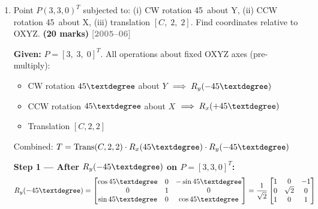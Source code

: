 \documentclass[12pt,a3paper]{article}
\newcommand{\yr}[1]{\hfill\textcolor{gray}{\small\textbf{[#1]}}}
\newcommand{\mk}[1]{\textcolor{orange!70!black}{\small\textbf{(#1 marks)}}}
\begin{document}
\begin{enumerate}
\begin{tcolorbox}[enhanced,breakable,ansbox,colback=cD!4,colframe=cD,
  boxrule=0.8pt,arc=5pt,
  title={\textbf{Answer}},fonttitle=\bfseries\color{white},colbacktitle=cD]
\[
  \boxed{T_{\text{new}} = \begin{bmatrix}0\\4\sqrt{3}\\-2\sqrt{3}\end{bmatrix}
  \approx \begin{bmatrix}0\\6.928\\-3.464\end{bmatrix}}
\]

\textit{Observation: The final position equals exactly the translation
vector from step (iii). This occurs because the frame's origin starts
at $[0,0,0]$, and the two rotations do not change the origin — only the
final translation moves it. The resulting orientation, however, has
changed significantly due to the two rotations.}

\end{tcolorbox}

\item \label{qlabel:C4-Q6}
Point $P(3,3,0)^T$ subjected to: (i) CW rotation 45\textdegree\ about
Y, (ii) CCW rotation 45\textdegree\ about X, (iii) translation
$[C,\;2,\;2]$. Find coordinates relative to OXYZ. \mk{20}
\yr{2005--06}

\begin{tcolorbox}[enhanced,breakable,ansbox,colback=cD!4,colframe=cD,
  boxrule=0.8pt,arc=5pt,
  title={\textbf{Answer}},fonttitle=\bfseries\color{white},colbacktitle=cD]

\textbf{Given:} $P = [3,\;3,\;0]^T$. All operations about fixed OXYZ
axes (pre-multiply):
\begin{itemize}[leftmargin=1.5em,itemsep=2pt]
  \item CW rotation $45\textdegree$ about $Y$ $\implies R_y(-45\textdegree)$
  \item CCW rotation $45\textdegree$ about $X$ $\implies R_x(+45\textdegree)$
  \item Translation $[C,2,2]$
\end{itemize}

Combined: $T = \mathrm{Trans}(C,2,2)\cdot R_x(45\textdegree)\cdot R_y(-45\textdegree)$

\textbf{Step 1 — After $R_y(-45\textdegree)$ on $P=[3,3,0]^T$:}
\[
  R_y(-45\textdegree) =
  \begin{bmatrix}
    \cos45\textdegree & 0 & -\sin45\textdegree\\
    0 & 1 & 0\\
    \sin45\textdegree & 0 & \cos45\textdegree
  \end{bmatrix}
  = \frac{1}{\sqrt{2}}
  \begin{bmatrix}1&0&-1\\0&\sqrt{2}&0\\1&0&1\end{bmatrix}
\]


\end{tcolorbox}
\end{enumerate}
\end{document}
